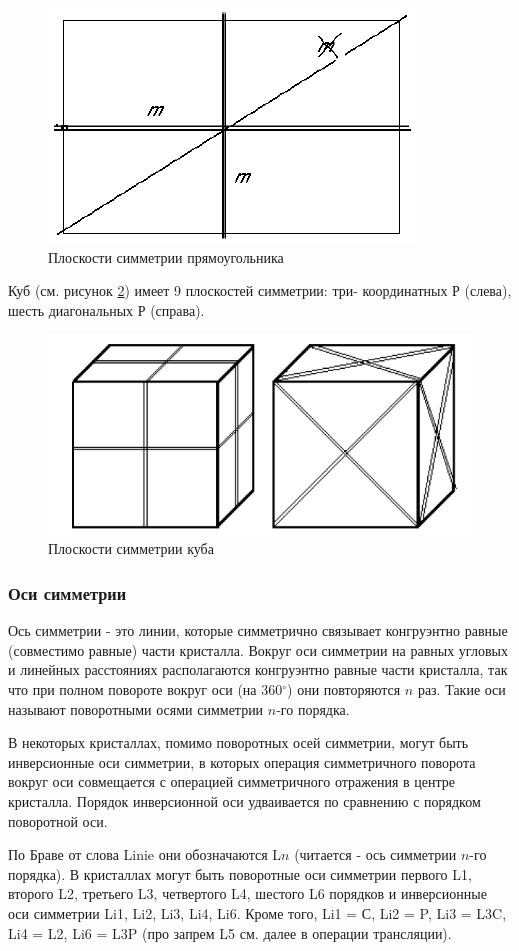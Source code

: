 \documentclass[a4paper, 12pt]{article}
\begin{document}
\begin{figure}[H]
	\centering
	\includegraphics[width=0.5\linewidth]{Rectangle}
	\caption{Плоскости симметрии прямоугольника}
	\label{fig:rect}
\end{figure}

Куб (см. рисунок \ref{fig:cube}) имеет 9 плоскостей симметрии: три- координатных Р (слева), шесть диагональных Р (справа).

\begin{figure}[H]
	\centering
	\includegraphics[width=0.5\linewidth]{Cube}
	\caption{Плоскости симметрии куба}
	\label{fig:cube}
\end{figure}

\subsubsection*{Оси симметрии}

Ось симметрии - это линии, которые симметрично связывает конгруэнтно равные (совместимо равные) части кристалла.
Вокруг оси симметрии на равных угловых и линейных расстояниях располагаются конгруэнтно равные части кристалла, так что при полном повороте вокруг оси (на 360$^\circ$) они повторяются $n$ раз. Такие оси называют поворотными осями симметрии $n$-го порядка.

В некоторых кристаллах, помимо поворотных осей симметрии, могут быть инверсионные оси симметрии, в которых операция симметричного поворота вокруг оси совмещается с операцией симметричного отражения в центре кристалла. Порядок инверсионной оси удваивается по сравнению с порядком поворотной оси.

По Браве от слова Linie они обозначаются L$n$ (читается - ось симметрии $n$-го порядка). В кристаллах могут быть поворотные оси симметрии первого L1, второго L2, третьего L3, четвертого L4, шестого L6 порядков и инверсионные оси симметрии Li1, Li2, Li3, Li4, Li6. Кроме того, Li1 = С, Li2 = P, Li3 = L3C, Li4 = L2, Li6 = L3P (про запрем L5 см. далее в операции трансляции).
\end{document}
